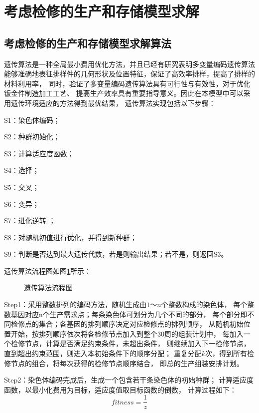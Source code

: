\section{考虑检修的生产和存储模型求解}

\subsection{考虑检修的生产和存储模型求解算法}
遗传算法\cite{王小平2002遗传算法}是一种全局最小费用优化方法，并且已经有研究表明多变量编码遗传算法
\cite{张京京2022多变量编码遗传算法在管道类零件展开图排样中的应用,jiyugaijinyichuansuanfa}
能够准确地表征排样件的几何形状及位置特征，保证了高效率排样，提高了排样的材料利用率，
同时，验证了多变量编码遗传算法具有可行性与有效性，对于优化钣金件制造加工工艺、
提高生产效率具有重要指导意义。因此在本模型中可以采用遗传环境适应的方法得到最优结果，
遗传算法实现包括以下步骤：

S1：染色体编码；

S2：种群初始化；

S3：计算适应度函数；

S4：选择；

S5：交叉；

S6：变异；

S7：进化逆转 ；

S8：对随机初值进行优化，并得到新种群；

S9：判断是否达到最大遗传代数，若是则输出结果；若不是，则返回S3。

遗传算法流程图如图\ref{f.ch4-1}所示：

\begin{figure}[h]
    \centering
    
    \caption{遗传算法流程图}
    \label{f.ch4-1}
\end{figure}

Step1：采用整数排列的编码方法，随机生成由$1～n$个整数构成的染色体，
每个整数基因对应n个生产需求点；每条染色体可划分为几个不同的部分，
每个部分即不同检修点的集合；各基因的排列顺序决定对应检修点的排列顺序，
从随机初始位置开始，按排列顺序依次将各检修节点加入到整个30周的组装计划中，
每加入一个检修节点，计算是否满足约束条件，未超出条件，
则继续加入下一检修节点，直到超出约束范围，则进入本初始条件下的顺序分配；
重复分配$k$次，得到所有检修节点的组合，将每次获得的检修节点顺序结合，
即总的生产组装安排计划\cite{包子阳2016智能优化算法}。

Step2：染色体编码完成后，生成一个包含若干条染色体的初始种群；
计算适应度函数，以最小化费用为目标，适应度值取目标函数的倒数，
计算过程如下：
\begin{equation}
    \label{eq_fitness}
    fitness=\frac{1}{z}
\end{equation}

